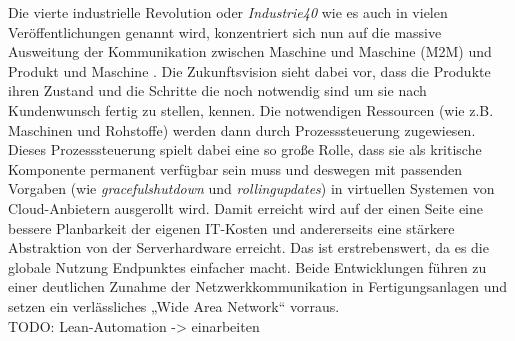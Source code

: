 Die vierte industrielle Revolution oder \textit{\Gls{Industrie40}} wie es auch in vielen Veröffentlichungen genannt wird, konzentriert sich nun auf die massive Ausweitung der Kommunikation zwischen Maschine und Maschine (\Gls{M2M}) und Produkt und Maschine \cite{lasi2014industry}. Die Zukunftsvision sieht dabei vor, dass die Produkte ihren Zustand und die Schritte die noch notwendig sind um sie nach Kundenwunsch fertig zu stellen, kennen. Die notwendigen Ressourcen (wie z.B. Maschinen und Rohstoffe) werden dann durch Prozesssteuerung zugewiesen. Dieses Prozesssteuerung spielt dabei eine so große Rolle, dass sie als kritische Komponente permanent verfügbar sein muss und deswegen mit passenden Vorgaben (wie \textit{\gls{gracefulshutdown}} und \textit{\Gls{rollingupdates}}) in virtuellen Systemen von Cloud-Anbietern ausgerollt wird. Damit erreicht wird auf der einen Seite eine bessere Planbarkeit der eigenen IT-Kosten und andererseits eine stärkere Abstraktion von der Serverhardware erreicht. Das ist erstrebenswert, da es die globale Nutzung Endpunktes einfacher macht\cite{wollschlaeger2017future}. Beide Entwicklungen führen zu einer deutlichen Zunahme der Netzwerkkommunikation in Fertigungsanlagen und setzen ein verlässliches „Wide Area Network“ vorraus.\\

TODO: Lean-Automation -> einarbeiten

